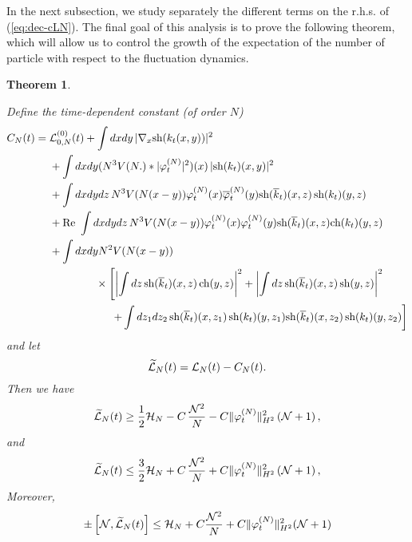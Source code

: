 \documentclass[11pt,a4paper]{article}
\newtheorem{thm}{Theorem}[section]  %
\newcommand{\wt}{\widetilde}
\newcommand{\cH}{{\cal H}}
\newcommand{\cL}{{\cal L}}
\newcommand{\cN}{{\cal N}}
\begin{document}
In the next subsection, we study separately the different terms on the r.h.s. of (\ref{eq:dec-cLN}). The final goal of this analysis is to prove the following theorem, which will allow us to control the growth of the expectation of the number of particle with respect to the fluctuation dynamics.
\begin{thm}\label{thm:L}

Define the time-dependent constant (of order $N$)
\begin{equation}\label{eq:CNt} \begin{split} 
C_N (t) = \; &\cL^{(0)}_{0,N} (t) + \int dx dy \, |\nabla_x \text{sh} (k_t (x,y))|^2  \\ &+  \int dx dy (N^3 V(N.) * |\varphi_t^{(N)}|^2) (x) \, |\text{sh} (k_t) (x,y)|^2 \\ &+ \int dx dy dz \, N^3 V(N (x-y)) \varphi_t^{(N)} (x) \overline{\varphi}_t^{(N)} (y) \text{sh} (\overline{k}_t) (x,z)  \, \text{sh} (k_t) (y,z)  \\ &+ \text{Re } \int dx dy dz \, N^3 V(N (x-y)) \varphi_t^{(N)} (x) \varphi_t^{(N)} (y) \text{sh} (\overline{k}_t) (x,z) \text{ch} (k_t) (y,z)  \\
&+ \int dx dy N^2 V(N (x-y)) \\ &\hspace{1.5cm}  \times \left[ \left|\int dz \, \text{sh} (\overline{k}_t) (x,z) \, \text{ch} (y,z) \right|^2  + \left| \int dz \, \text{sh} (\overline{k}_t) (x,z) \, \text{sh} (y,z) \right|^2 \right. \\ &\hspace{2cm}  \left. 
+  \int dz_1 dz_2 \, \text{sh} (\overline{k}_t) (x,z_1) \, \text{sh} (k_t) (y,z_1)  \text{sh} (\overline{k}_t) (x,z_2) \, \text{sh} (k_t) (y,z_2) \right] 
\end{split} \end{equation}
and let
\begin{equation}\label{eq:wtcL} \wt{\cL}_N (t) = \cL_N (t) - C_N (t). \end{equation}
Then we have
\begin{equation}\label{eq:thmL-1} \wt{\cL}_N (t) \geq \frac{1}{2} \cH_N - C \, \frac{\cN^2}{N}  - C \| \varphi_t^{(N)} \|_{H^2}^2  \left(\cN + 1\right), \end{equation}
and
\begin{equation}\label{eq:thmL-1b} \wt{\cL}_N (t) \leq \frac{3}{2} \cH_N + C \, \frac{\cN^2}{N}  +  C \| \varphi_t^{(N)} \|_{H^2}^2  \left(\cN + 1\right), \end{equation}
Moreover, 
\begin{equation}\label{eq:thmL-2} \pm \left[ \cN , \wt{\cL}_N (t) \right]  \leq \cH_N + C \frac{\cN^2}{N} + C \| \varphi_t^{(N)} \|_{H^2}^2 (\cN+1) \end{equation}

\end{thm}
\end{document}
